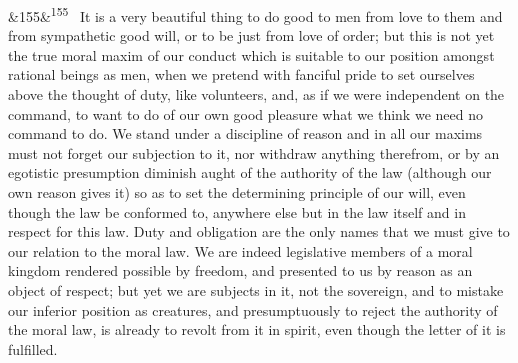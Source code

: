 \documentclass[12pt]{article}
\newcommand{\para}[1][]{\par\noindent\ifx&#1&\else\textsuperscript{\footnotesize #1}~\fi}
\begin{document}
\para[155] It is a very beautiful thing to do good to men from love to them and from sympathetic good will, or to be just from love of order; but this is not yet the true moral maxim of our conduct which is suitable to our position amongst rational beings as men, when we pretend with fanciful pride to set ourselves above the thought of duty, like volunteers, and, as if we were independent on the command, to want to do of our own good pleasure what we think we need no command to do. We stand under a discipline of reason and in all our maxims must not forget our subjection to it, nor withdraw anything therefrom, or by an egotistic presumption diminish aught of the authority of the law (although our own reason gives it) so as to set the determining principle of our will, even though the law be conformed to, anywhere else but in the law itself and in respect for this law. Duty and obligation are the only names that we must give to our relation to the moral law. We are indeed legislative members of a moral kingdom rendered possible by freedom, and presented to us by reason as an object of respect; but yet we are subjects in it, not the sovereign, and to mistake our inferior position as creatures, and presumptuously to reject the authority of the moral law, is already to revolt from it in spirit, even though the letter of it is fulfilled.
\end{document}
